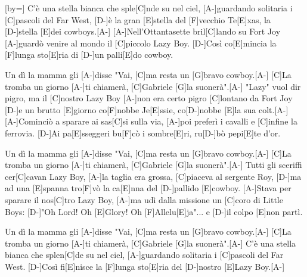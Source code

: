 [by={}]
\beginverse 
[A-]C'è una stella bianca che sple[C]nde su nel ciel,
[A-]guardando solitaria i [C]pascoli del Far West,
[D-]è la gran [E]stella del [F]vecchio Te[E]xas, la [D-]stella [E]dei cowboys.[A-]
[A-]Nell'Ottantasette bril[C]lando su Fort Joy
[A-]guardò venire al mondo il [C]piccolo Lazy Boy.
[D-]Così co[E]mincia la [F]lunga sto[E]ria di [D-]un palli[E]do cowboy. 
\endverse 

\beginchorus  
[C]Un dì la mamma gli [A-]disse "Vai,
[C]ma resta un [G]bravo cowboy.[A-]
[C]La tromba un giorno [A-]ti chiamerà,
[C]Gabriele [G]la suonerà".[A-]
\endchorus
\beginverse 
[A-]"Lazy" vuol dir pigro, ma il [C]nostro Lazy Boy
[A-]non era certo pigro [C]lontano da Fort Joy
[D-]e un brutto [E]giorno co[F]nobbe Je[E]ssie, co[D-]nobbe [E]la sua colt.[A-]
[A-]Cominciò a sparare ai sas[C]si sulla via,
[A-]poi preferì i cavalli e [C]infine la ferrovia.
[D-]Ai pa[E]sseggeri bu[F]cò i sombre[E]ri, ru[D-]bò pepi[E]te d'or. 
\endverse 

\beginchorus  
[C]Un dì la mamma gli [A-]disse "Vai,
[C]ma resta un [G]bravo cowboy.[A-]
[C]La tromba un giorno [A-]ti chiamerà,
[C]Gabriele [G]la suonerà".[A-]
\endchorus
\beginverse 
[A-]Tutti gli sceriffi cer[C]cavan Lazy Boy,
[A-]la taglia era grossa, [C]piaceva al sergente Roy,
[D-]ma ad una [E]spanna tro[F]vò la ca[E]nna del [D-]pallido [E]cowboy.
[A-]Stava per sparare il nos[C]tro Lazy Boy,
[A-]ma udì dalla missione un [C]coro di Little Boys:
[D-]"Oh Lord! Oh [E]Glory! Oh [F]Allelu[E]ja"... e [D-]il colpo [E]non partì. 
\endverse 

\beginchorus  
[C]Un dì la mamma gli [A-]disse "Vai,
[C]ma resta un [G]bravo cowboy.[A-]
[C]La tromba un giorno [A-]ti chiamerà,
[C]Gabriele [G]la suonerà".[A-]
\endchorus
\beginverse 
[A-]C'è una stella bianca che splen[C]de su nel ciel,
[A-]guardando solitaria i [C]pascoli del Far West.
[D-]Così fi[E]nisce la [F]lunga sto[E]ria del [D-]nostro [E]Lazy Boy.[A-]
\endverse 
\endsong 

